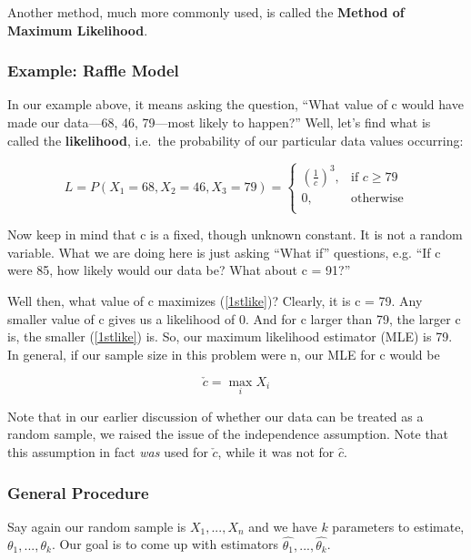 Another method, much more commonly used, is called the {\bf Method of
Maximum Likelihood}.  

\subsubsection{Example:  Raffle Model}

In our example above, it means asking the
question, ``What value of c would have made our data---68, 46, 79---most
likely to happen?''  Well, let's find what is called the {\bf
likelihood}, i.e.\ the probability of our particular data values occurring:

\begin{equation}
\label{1stlike}
L = P(X_1 = 68, X_2 = 46, X_3 = 79) = 
\begin{cases} 
(\frac{1}{c})^3, & \text{if $c \geq 79$} \\ 
0, & \text{otherwise} \\ 
\end{cases} 
\end{equation}

Now keep in mind that c is a fixed, though unknown constant.  It is not
a random variable.  What we are doing here is just asking ``What if''
questions, e.g. ``If c were 85, how likely would our data be?  What
about c = 91?''

Well then, what value of c maximizes (\ref{1stlike})?  Clearly, it is c
= 79.  Any smaller value of c gives us a likelihood of 0.  And for c
larger than 79, the larger c is, the smaller (\ref{1stlike}) is.  So,
our maximum likelihood estimator (MLE) is 79.  In general, if our sample
size in this problem were n, our MLE for c would be

\begin{equation}
\check{c} = \max_i X_i
\end{equation}

Note that in our earlier discussion of whether our data can be treated
as a random sample, we raised the issue of the independence assumption.
Note that this assumption in fact {\it was} used for $\check{c}$, while
it was not for $\widehat{c}$.

\subsubsection{General Procedure}

Say again our random sample is $X_1,...,X_n$ and we have $k$ parameters to
estimate, $\theta_1,...,\theta_k$.  Our goal is to come up with
estimators $\widehat{\theta_1},...,\widehat{\theta_k}$.  

